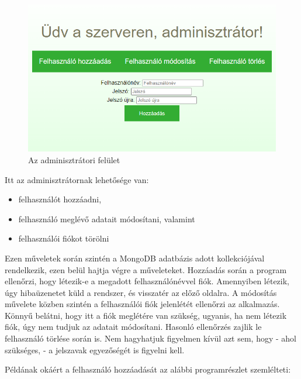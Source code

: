 \begin{figure}[h]
	\centering
		\includegraphics[width=12truecm, height=7truecm]{images/admin_oldal.png}
	\caption{Az adminisztrátori felület}
	\label{fig:admin}
\end{figure}

Itt az adminisztrátornak lehetősége van:

\begin{itemize}
\item{felhasználót hozzáadni,}
\item{felhasználó meglévő adatait módosítani, valamint}
\item{felhasználói fiókot törölni}
\end{itemize}

Ezen műveletek során szintén a MongoDB adatbázis adott kollekciójával rendelkezik, ezen belül hajtja végre a műveleteket. Hozzáadás során a program ellenőrzi, hogy létezik-e a megadott felhasználónévvel fiók. Amennyiben létezik, úgy hibaüzenetet küld a rendszer, és visszatér az előző oldalra. A módosítás művelete közben szintén a felhasználói fiók jelenlétét ellenőrzi az alkalmazás. Könnyű belátni, hogy itt a fiók meglétére van szükség, ugyanis, ha nem létezik fiók, úgy nem tudjuk az adatait módosítani. Hasonló ellenőrzés zajlik le felhasználó törlése során is. Nem hagyhatjuk figyelmen kívül azt sem, hogy - ahol szükséges, - a jelszavak egyezőségét is figyelni kell.

Példának okáért a felhasználó hozzáadását az alábbi programrészlet szemlélteti:

